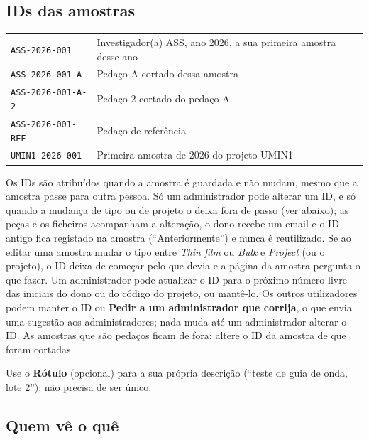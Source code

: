 \documentclass[11pt,a4paper]{article}
\newcommand{\ui}[1]{\textsf{\textbf{#1}}}
\newcommand{\sid}[1]{\texttt{#1}}
\begin{document}
\subsection{IDs das amostras}

\begin{center}
\begin{tabular}{@{}ll@{}}
\toprule
\sid{ASS-2026-001}       & Investigador(a) ASS, ano 2026, a sua primeira amostra desse ano \\
\sid{ASS-2026-001-A}     & Pedaço A cortado dessa amostra \\
\sid{ASS-2026-001-A-2}   & Pedaço 2 cortado do pedaço A \\
\sid{ASS-2026-001-REF}   & Pedaço de referência \\
\sid{UMIN1-2026-001}     & Primeira amostra de 2026 do projeto UMIN1 \\
\bottomrule
\end{tabular}
\end{center}

Os IDs são atribuídos quando a amostra é guardada e não mudam, mesmo que
a amostra passe para outra pessoa. Só um administrador pode alterar um ID,
e só quando a mudança de tipo ou de projeto o deixa fora de passo (ver abaixo); as
peças e os ficheiros acompanham a alteração, o dono recebe um email e o ID antigo fica registado na amostra (``Anteriormente'') e nunca é reutilizado. Se ao editar uma amostra mudar o tipo entre \emph{Thin film} ou \emph{Bulk} e \emph{Project} (ou o projeto), o ID deixa de começar pelo que devia e a página da amostra pergunta o que fazer. Um administrador pode atualizar o ID para o próximo número livre das iniciais do dono ou do código do projeto, ou mantê-lo. Os outros utilizadores podem manter o ID ou \ui{Pedir a um administrador que corrija}, o que envia uma sugestão aos administradores; nada muda até um administrador alterar o ID. As amostras que são pedaços ficam de fora: altere o ID da amostra de que foram cortadas.

Use o \ui{Rótulo} (opcional) para a sua
própria descrição (``teste de guia de onda, lote 2''); não precisa de ser
único.

\subsection{Quem vê o quê}
\end{document}
